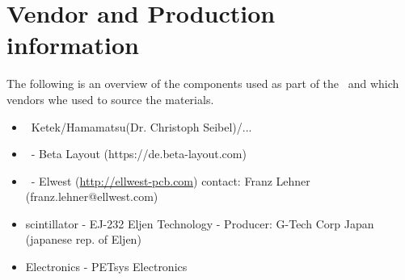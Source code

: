 \documentclass[../BTOF_summary.tex]{subfiles}
\begin{document}
\section{Vendor and Production information}

The following is an overview of the components used as part of the \btofD\ and which vendors whe used to source the materials.

\begin{itemize}
    \item \sipms\ Ketek/Hamamatsu(Dr. Christoph Seibel)/... 
    \item \sensorboard\ - Beta Layout (https://de.beta-layout.com)
    \item \railboard\ - Elwest (\url{http://ellwest-pcb.com}) contact: Franz Lehner (franz.lehner@ellwest.com)
    \item scintillator - EJ-232 Eljen Technology - Producer: G-Tech Corp Japan (japanese rep. of Eljen)
    \item Electronics - PETsys Electronics
\end{itemize}
\end{document}
